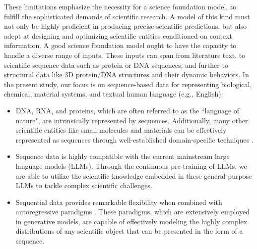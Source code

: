 These limitations emphasize the necessity for a science foundation model, to fulfill the sophisticated demands of scientific research. A model of this kind must not only be highly proficient in producing precise scientific predictions, but also adept at designing and optimizing scientific entities conditioned on context information. A good science foundation model ought to have the capacity to handle a diverse range of inputs. These inputs can span from literature text, to scientific sequence data such as protein or DNA sequences, and further to structural data like 3D protein/DNA structures and their dynamic behaviors. In the present study, our focus is on sequence-based data for representing biological, chemical, material systems, and textual human language (e.g., English):
\begin{itemize}
\item DNA, RNA, and proteins, which are often referred to as the ``language of nature", are intrinsically represented by sequences. Additionally, many other scientific entities like small molecules and materials can be effectively represented as sequences through well-established domain-specific techniques \cite{Weininger1988}.
\item Sequence data is highly compatible with the current mainstream large language models (LLMs). Through the continuous pre-training of LLMs, we are able to utilize the scientific knowledge embedded in these general-purpose LLMs to tackle complex scientific challenges.  
\item Sequential data provides remarkable flexibility when combined with autoregressive paradigms \cite{bond2021deep,yenduri2024gpt}%
. These paradigms, which are extensively employed in generative models, are capable of effectively modeling the highly complex distributions of any scientific object that can be presented in the form of a sequence.  
\end{itemize}

